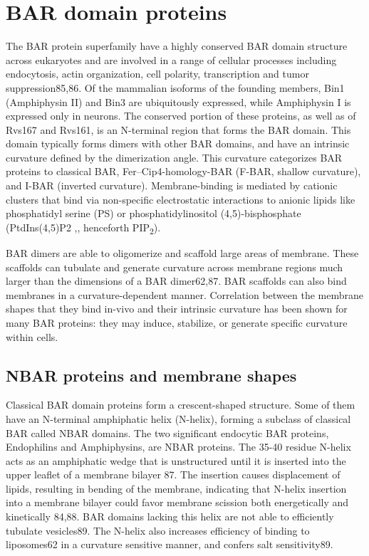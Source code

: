 		
\section{BAR domain proteins}
	
The BAR protein superfamily have a highly conserved BAR domain structure across eukaryotes and are involved in a range of cellular processes including endocytosis, actin organization, cell polarity, transcription and tumor suppression85,86. 
Of the mammalian isoforms of the founding members, Bin1 (Amphiphysin II) and Bin3 are ubiquitously expressed, while Amphiphysin I is expressed only in neurons. The conserved portion of these proteins, as well as of Rvs167 and Rvs161, is an N-terminal region that forms the BAR domain. This domain typically forms dimers with other BAR domains, and have an intrinsic curvature defined by the dimerization angle. This curvature categorizes BAR proteins to classical BAR, Fer–Cip4-homology-BAR (F-BAR, shallow curvature), and I-BAR (inverted curvature). Membrane-binding is mediated by cationic clusters that bind via non-specific electrostatic interactions to anionic lipids like phosphatidyl serine (PS) or phosphatidylinositol (4,5)-bisphosphate (PtdIns(4,5)P2 ,, henceforth PIP\textsubscript{2}).

\vspace{5mm}
BAR dimers are able to oligomerize and scaffold large areas of membrane. These scaffolds can tubulate and generate curvature across membrane regions much larger than the dimensions of a BAR dimer62,87. BAR scaffolds can also bind membranes in a curvature-dependent manner. Correlation between the membrane shapes that they bind in-vivo and their intrinsic curvature has been shown for many BAR proteins: they may induce, stabilize, or generate specific curvature within cells. 


	\subsection{NBAR proteins and membrane shapes}	
	Classical BAR domain proteins form a crescent-shaped structure. Some of them have an N-terminal amphiphatic helix (N-helix), forming a subclass of classical BAR called NBAR domains. The two significant endocytic BAR proteins, Endophilins and Amphiphysins, are NBAR proteins. The 35-40 residue N-helix acts as an amphiphatic wedge that is unstructured until it is inserted into the upper leaflet of a membrane bilayer 87. The insertion causes displacement of lipids, resulting in bending of the membrane, indicating that N-helix insertion into a membrane bilayer could favor membrane scission both energetically and kinetically 84,88. BAR domains lacking this helix are not able to efficiently tubulate vesicles89. The N-helix also increases efficiency of binding to liposomes62 in a curvature sensitive manner, and confers salt sensitivity89. 


